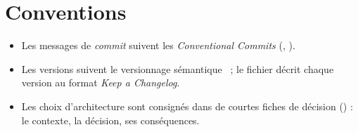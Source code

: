 \section{Conventions}

\begin{itemize}
  \item Les messages de \emph{commit} suivent les \emph{Conventional Commits}
        (, ).
  \item Les versions suivent le versionnage sémantique~\cite{semver} ; le fichier
         décrit chaque version au format \emph{Keep a Changelog}.
  \item Les choix d'architecture sont consignés dans de courtes fiches de décision
        () : le contexte, la décision, ses conséquences.
\end{itemize}
